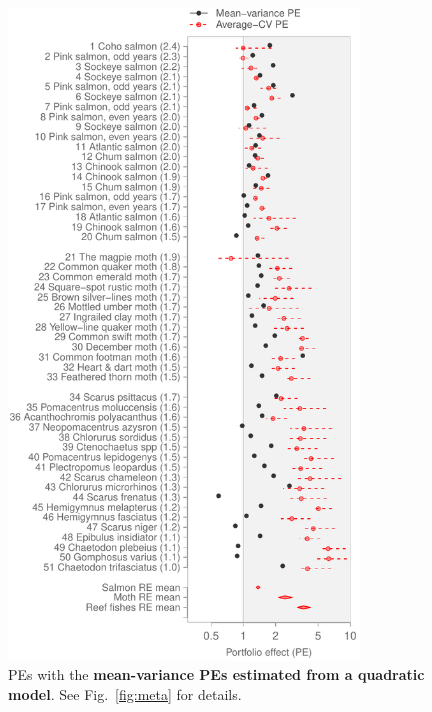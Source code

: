 \begin{figure}[htbp]
  \centering
  \includegraphics[height=6.8in]{prophets/PE_comparison_z_meta_taxa_quad_20121214.pdf}
  \caption{
    PEs with the \textbf{mean-variance PEs estimated from a quadratic model}.
    See Fig.~\ref{fig:meta} for details.
}
\label{fig:meta-quad}
\end{figure}


